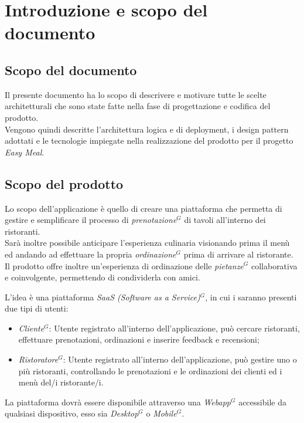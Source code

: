 \nonstopmode
\section{Introduzione e scopo del documento}

\subsection{Scopo del documento}

Il presente documento ha lo scopo di descrivere e motivare tutte le scelte architetturali che sono state fatte nella fase di progettazione e codifica del prodotto.\\
Vengono quindi descritte l'architettura logica e di deployment, i design pattern adottati e le tecnologie impiegate nella realizzazione del prodotto per il progetto \textit{Easy Meal}.
\subsection{Scopo del prodotto}

Lo scopo dell’applicazione è quello di creare una piattaforma che permetta di gestire e semplificare il processo di \emph{prenotazione}$^{G}$ di tavoli all’interno dei ristoranti. \\
Sarà inoltre possibile anticipare l’esperienza culinaria visionando prima il menù ed andando ad effettuare la propria \emph{ordinazione}$^{G}$ prima di arrivare al ristorante. \\
Il prodotto offre inoltre un’esperienza di ordinazione delle \emph{pietanze}$^{G}$ collaborativa e coinvolgente, permettendo di condividerla con amici.

L’idea è una piattaforma \emph{SaaS (Software as a Service)}$^{G}$, in cui i saranno presenti due tipi di utenti:
\begin{itemize}
	\item \emph{Cliente}$^{G}$: Utente registrato all’interno dell’applicazione, può cercare ristoranti, effettuare prenotazioni, ordinazioni e inserire feedback e recensioni;
	\item \emph{Ristoratore}$^{G}$: Utente registrato all’interno dell’applicazione, può gestire uno o più ristoranti, controllando le prenotazioni e le ordinazioni dei clienti ed i menù del/i ristorante/i.
\end{itemize}


La piattaforma dovrà essere disponibile attraverso una \emph{Webapp}$^{G}$ accessibile da qualsiasi dispositivo, esso sia \emph{Desktop}$^{G}$ o \emph{Mobile}$^{G}$.


